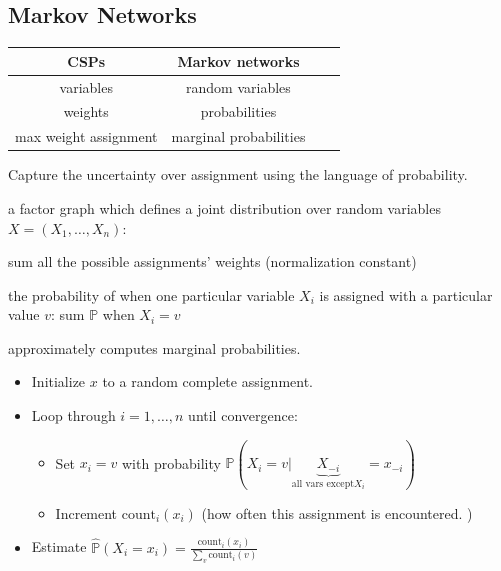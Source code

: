 
\subsection{Markov Networks}

\begin{tabular}{|c|c|c|c|} 
    \hline
    \textbf{CSPs} & \textbf{Markov networks} \\
    \hline
    variables & random variables \\ 
    \hline
    weights & probabilities \\
    \hline
    max weight assignment & marginal probabilities \\
    \hline
\end{tabular}

Capture the uncertainty over assignment using the language of probability.

 a factor graph which defines a joint distribution over
random variables $X = (X_1,\dots,X_n)$:

 sum all the possible assignments'
weights (normalization constant)

 the probability of when one particular variable
$X_i$ is assigned with a particular value $v$: sum $\mathbb{P}$ when $X_i = v$

 approximately computes marginal probabilities.

\begin{itemize}
    \item Initialize $x$ to a random complete assignment.
    \item Loop through $i=1,\dots,n$ until convergence: \begin{itemize}
        \item Set $x_i = v$ with probability $\mathbb{P}(X_i = v | \underbrace{X_{-i}}_{\text{all vars except} X_i}=x_{-i})$
        \item Increment $\text{count}_i(x_i)$ (how often this assignment is encountered. )
    \end{itemize}
    \item Estimate $\hat{\mathbb{P}}(X_i=x_i)=\frac{\text{count}_i(x_i)}{\sum_{v}\text{count}_i(v)}$
\end{itemize}

